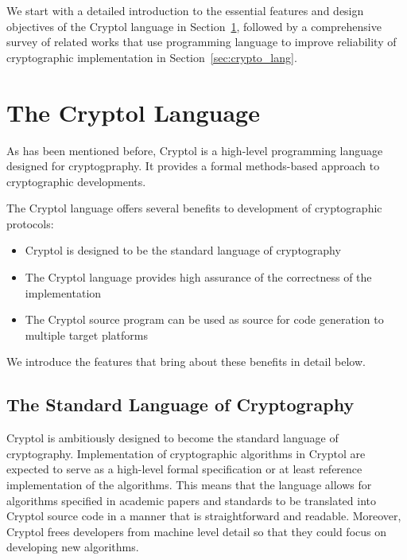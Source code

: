 \documentclass[a4paper, notitlepage]{report}
\renewcommand{\paragraph}[1]{\vspace*{1em}\noindent\textbf{#1}\hspace*{1em}}
\begin{document}
We start with a detailed introduction to the essential features and
design objectives of the Cryptol language in Section~\ref{sec:cryptol},
followed by a comprehensive survey of related works that use programming
language to improve reliability of cryptographic implementation in
Section~\ref{sec:crypto_lang}.

\section{The Cryptol Language}
\label{sec:cryptol}

As has been mentioned before, Cryptol is a high-level programming language
designed for cryptogpraphy. It provides a formal methods-based approach
to cryptographic developments.

The Cryptol language offers several benefits to development of cryptographic
protocols:
\begin{itemize}
\item Cryptol is designed to be the standard language of cryptography
\item The Cryptol language provides high assurance of the correctness
of the implementation
\item The Cryptol source program can be used as source for code generation
to multiple target platforms
\end{itemize} 

We introduce the features that bring about these benefits in detail below.

\subsection{The Standard Language of Cryptography}

Cryptol is ambitiously designed to become the standard language of cryptography.
Implementation of cryptographic algorithms in Cryptol are expected to serve as 
a high-level formal specification or at least reference implementation 
of the algorithms.
This means that the language allows for algorithms specified in academic
papers and standards to be translated into Cryptol source code in a manner that
is straightforward and readable.
Moreover, Cryptol frees developers from machine level detail
so that they could focus on developing new algorithms.
\end{document}
